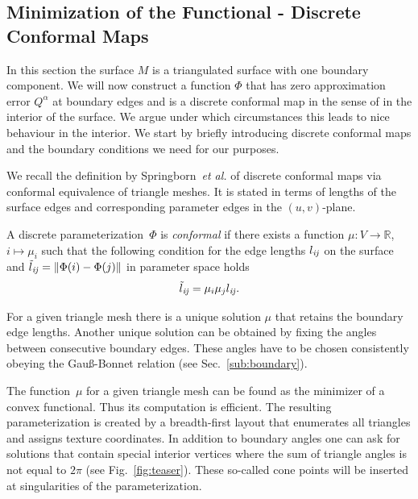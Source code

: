 \subsection{Minimization of the Functional - Discrete Conformal Maps}
\label{subsec:algorithm}

In this section the surface $M$ is a triangulated surface with one boundary
component. We will now construct a function $\Phi$ that
has zero approximation error $Q^\alpha$ at boundary edges and is a discrete
conformal map in the sense of \cite{Springborn2008} in the interior of the
surface. We argue under which circumstances this leads to nice
behaviour in the interior. We start by briefly introducing discrete conformal
maps and the boundary conditions we need for our purposes.

We recall the definition by Springborn~\emph{et al.} of discrete conformal 
maps via conformal equivalence of triangle meshes. It is stated in terms of
lengths of the surface edges and corresponding parameter edges in the 
$(u,v)$-plane.
\begin{definition} 
  A discrete parameterization~$\Phi$ is \emph{conformal} if there exists a
function $\mu:V \to \mathbb{R}$, $i \mapsto \mu_i$ such that the following
condition for the edge lengths $l_{\mathrm{\it{ij}}}$ on the surface and
$\tilde{l}_{\mathrm{\it{ij}}}=\Vert\Phi(i)-\Phi(j)\Vert$ in parameter space holds
\begin{eqnarray}
  \label{eq:discrete_conformal} 
  \tilde{l}_{\mathrm{\it{ij}}}=\mu_i\mu_j l_{\mathrm{\it{ij}}}.
\end{eqnarray}
\end{definition}
For a given triangle mesh there is a unique solution $\mu$ that retains the 
boundary edge lengths. Another unique solution can be obtained by fixing 
the angles between consecutive boundary edges. These angles have to be 
chosen consistently obeying the Gau\ss-Bonnet relation 
(see Sec.~\ref{sub:boundary}).

The function~$\mu$ for a given triangle mesh can be found as the minimizer 
of a convex functional. Thus its computation is efficient. The resulting 
parameterization is created by a breadth-first layout that enumerates 
all triangles and assigns texture coordinates. In addition to boundary angles 
one can ask for solutions that contain special interior vertices where the
 sum of triangle angles is not equal to $2\pi$ (see Fig.~\ref{fig:teaser}). 
These so-called cone points will be inserted at singularities of the 
parameterization.


